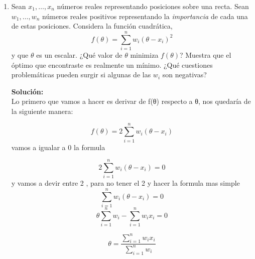 \documentclass[11pt,letterpaper]{article}
\newenvironment{solution}{%
  \noindent\begin{shaded}
  \textbf{Solución:}\ }{
  \end{shaded}%
}
\begin{document}
\begin{enumerate}
\item%
  Sean \(x_1,\dots,x_n\) números reales representando posiciones sobre
  una recta.  Sean \(w_1,\dots,w_n\) números reales positivos
  representando la \emph{importancia} de cada una de estas
  posiciones. Considera la función cuadrática,
  \[ f(\theta) = \sum_{i=1}^n w_i\left(\theta-x_i\right)^2 \]
  y que \(\theta\) es un escalar. ¿Qué valor de \(\theta\) minimiza
  \(f(\theta)\)? Muestra que el óptimo que encontraste es realmente un
  mínimo. ¿Qué cuestiones problemáticas pueden surgir si algunas de
  las \(w_i\) son negativas?
  \begin{solution}
 \\Lo primero que vamos a hacer es derivar de f(θ) respecto a θ, nos quedaría de la siguiente manera:

    \[ f(\theta) = 2 \sum_{i=1}^n w_i\left(\theta-x_i\right) \]
vamos a igualar a 0 la formula

    \[ 2 \sum_{i=1}^n w_i\left(\theta-x_i\right) =0\]
y vamos a devir entre 2 , para no tener el 2 y hacer la formula mas simple
 \[  \sum_{i=1}^n w_i\left(\theta-x_i\right) =0\]
\[  \theta\sum_{i=1}^n w_i-\sum_{i=1}^n w_i x_i=0\]

\[\theta = \frac{\sum_{i=1}^n w_i x_i}{\sum_{i=1}^n w_i}\]



\end{solution}
\end{enumerate}
\end{document}
